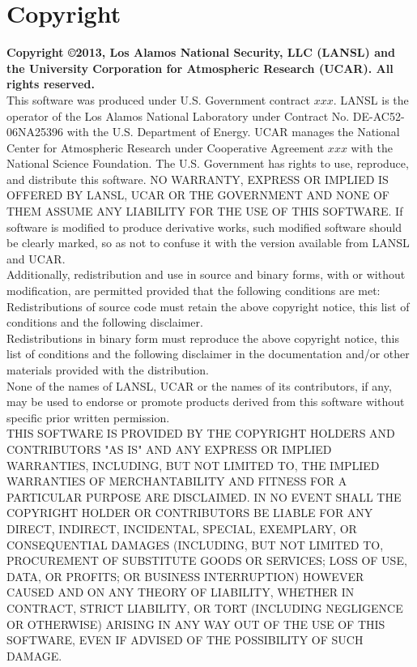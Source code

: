 \chapter*{Copyright}
\label{chap:copyright}

{\bf Copyright \copyright 2013,  Los Alamos National Security, LLC (LANSL) and the University Corporation for Atmospheric Research (UCAR). All rights reserved.} \\

This software was produced under U.S. Government contract $xxx$. LANSL is the operator of the Los Alamos National Laboratory under Contract No. DE-AC52-06NA25396 with the U.S. Department of Energy.  UCAR manages the National Center for Atmospheric Research under Cooperative Agreement $xxx$ with the National Science Foundation.  The U.S. Government has rights to use, reproduce, and distribute this software.  NO WARRANTY, EXPRESS OR IMPLIED IS OFFERED BY LANSL, UCAR OR THE GOVERNMENT AND NONE OF THEM ASSUME ANY LIABILITY FOR THE USE OF THIS SOFTWARE.  If software is modified to produce derivative works, such modified software should be clearly marked, so as not to confuse it with the version available from LANSL and UCAR.\\

Additionally, redistribution and use in source and binary forms, with or without modification, are permitted provided that the following conditions are met:\\

Redistributions of source code must retain the above copyright notice, this list of conditions and the following disclaimer.\\

Redistributions in binary form must reproduce the above copyright notice, this list of conditions and the following disclaimer in the documentation and/or other materials provided with the distribution.\\

None of the names of LANSL, UCAR or the names of its contributors, if any, may be used to endorse or promote products derived from this software without specific prior written permission.\\

THIS SOFTWARE IS PROVIDED BY THE COPYRIGHT HOLDERS AND CONTRIBUTORS "AS IS" AND ANY EXPRESS OR IMPLIED WARRANTIES, INCLUDING, BUT NOT LIMITED TO, THE IMPLIED WARRANTIES OF MERCHANTABILITY AND FITNESS FOR A PARTICULAR PURPOSE ARE DISCLAIMED. IN NO EVENT SHALL THE COPYRIGHT HOLDER OR CONTRIBUTORS BE LIABLE FOR ANY DIRECT, INDIRECT, INCIDENTAL, SPECIAL, EXEMPLARY, OR CONSEQUENTIAL DAMAGES (INCLUDING, BUT NOT LIMITED TO, PROCUREMENT OF SUBSTITUTE GOODS OR SERVICES; LOSS OF USE, DATA, OR PROFITS; OR BUSINESS INTERRUPTION) HOWEVER CAUSED AND ON ANY THEORY OF LIABILITY, WHETHER IN CONTRACT, STRICT LIABILITY, OR TORT (INCLUDING NEGLIGENCE OR OTHERWISE) ARISING IN ANY WAY OUT OF THE USE OF THIS SOFTWARE, EVEN IF ADVISED OF THE POSSIBILITY OF SUCH DAMAGE.

\newpage
